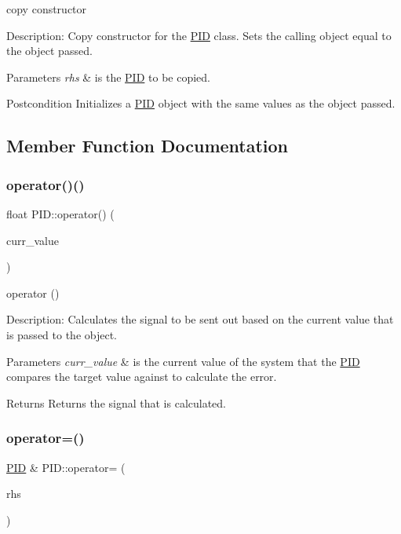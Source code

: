 copy constructor 

Description\+: Copy constructor for the \hyperlink{classPID}{P\+ID} class. Sets the calling object equal to the object passed. 
\begin{DoxyParams}{Parameters}
{\em rhs} & is the \hyperlink{classPID}{P\+ID} to be copied. \\
\hline
\end{DoxyParams}
\begin{DoxyPostcond}{Postcondition}
Initializes a \hyperlink{classPID}{P\+ID} object with the same values as the object passed. 
\end{DoxyPostcond}


\subsection{Member Function Documentation}
\mbox{\label{classPID_adb9d986a6d94b9e717c2b8f557cdd59c}} 
\subsubsection{\texorpdfstring{operator()()}{operator()()}}
{\footnotesize\ttfamily float P\+I\+D\+::operator() (\begin{DoxyParamCaption}\item[{const float}]{curr\+\_\+value }\end{DoxyParamCaption})}



operator () 

Description\+: Calculates the signal to be sent out based on the current value that is passed to the object. 
\begin{DoxyParams}{Parameters}
{\em curr\+\_\+value} & is the current value of the system that the \hyperlink{classPID}{P\+ID} compares the target value against to calculate the error. \\
\hline
\end{DoxyParams}
\begin{DoxyReturn}{Returns}
Returns the signal that is calculated. 
\end{DoxyReturn}
\mbox{\label{classPID_ac29f152d7dd94fa8d6af144c070a553b}} 
\subsubsection{\texorpdfstring{operator=()}{operator=()}}
{\footnotesize\ttfamily \hyperlink{classPID}{P\+ID} \& P\+I\+D\+::operator= (\begin{DoxyParamCaption}\item[{const \hyperlink{classPID}{P\+ID} \&}]{rhs }\end{DoxyParamCaption})}



